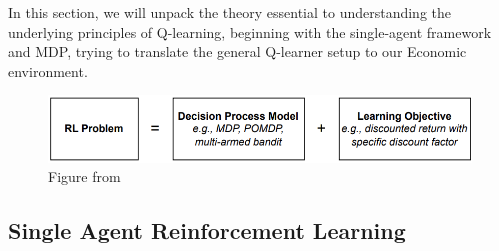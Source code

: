 \documentclass{article}
\begin{document}
In this section, we will unpack the theory essential to understanding the underlying principles of Q-learning, beginning with the single-agent framework and MDP, trying to translate the general Q-learner setup to our Economic environment. 
\begin{figure} [H]
    \centering
    \includegraphics[width=0.5\linewidth]{MARLside20.png}
    \caption{Figure from \citep[p. 19-21]{marl-book} }
    \label{fig:MARLside20}
\end{figure}
\subsection{Single Agent Reinforcement Learning}
\end{document}
